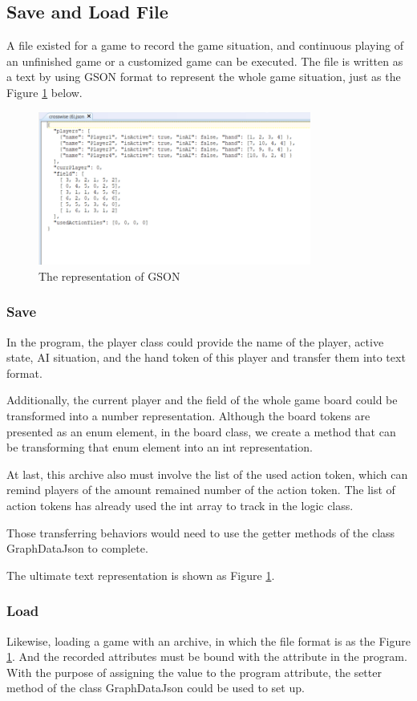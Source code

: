 \subsection{Save and Load File}
A file existed for a game to record the game situation, and continuous playing of an unfinished game or a customized game can be executed. The file is written as a text by using GSON format to represent the whole game situation, just as the Figure \ref{fig: JSONFile} below. 


\begin{figure}[h]
	\centering
	\includegraphics[width=0.8\textwidth]{image/JSON format}
	\caption{The representation of GSON}
	\label{fig: JSONFile}
\end{figure}


\subsubsection{Save}

In the program, the player class could provide the name of the player, active state, AI situation, and the hand token of this player and transfer them into text format.

Additionally, the current player and the field of the whole game board could be transformed into a number representation. Although the board tokens are presented as an enum element, in the board class, we create a method that can be transforming that enum element into an int representation. 

At last, this archive also must involve the list of the used action token, which can remind players of the amount remained number of the action token. The list of action tokens has already used the int array to track in the logic class.

Those transferring behaviors would need to use the getter methods of the class GraphDataJson to complete. 

The ultimate text representation is shown as Figure \ref{fig: JSONFile}.


\subsubsection{Load}

Likewise, loading a game with an archive, in which the file format is as the Figure \ref{fig: JSONFile}. And the recorded attributes must be bound with the attribute in the program.  With the purpose of assigning the value to the program attribute, the setter method of the class GraphDataJson could be used to set up. 